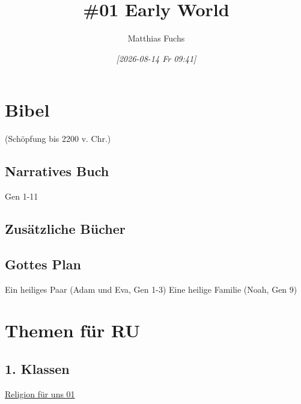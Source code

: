 \documentclass[11pt]{article}
\author{Matthias Fuchs}
\date{\textit{{[}2026-08-14 Fr 09:41]}}
\title{\#01 Early World}
\begin{document}
\maketitle
\tableofcontents

\section{Bibel}
\label{sec:orge8281ae}
(Schöpfung bis 2200 v. Chr.)
\subsection{Narratives Buch}
\label{sec:orgcbbab62}

Gen 1-11
\subsection{Zusätzliche Bücher}
\label{sec:orgfd8350b}

\subsection{Gottes Plan}
\label{sec:org62e60bc}

Ein heiliges Paar (Adam und Eva, Gen 1-3)
Eine heilige Familie (Noah, Gen 9)
\section{Themen für RU}
\label{sec:org46adee8}

\subsection{1. Klassen}
\label{sec:org9ab3da8}

\href{/home/matthias/Documents/notes/20250913T113018--religion-für-uns-01\_\_project\_topic01.org}{Religion für uns 01}
\end{document}
